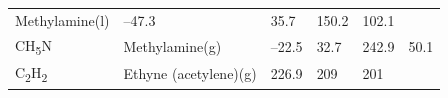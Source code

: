 \documentclass[
  9pt,
]{extbook}
\theoremstyle{definition}
\theoremstyle{definition}
\theoremstyle{definition}
\theoremstyle{remark}
\begin{document}
\begin{longtable}[]{@{}llllll@{}}
\begin{minipage}[t]{0.17\columnwidth}
Methylamine(l)\strut
\end{minipage} & \begin{minipage}[t]{0.15\columnwidth}\raggedright
--47.3\strut
\end{minipage} & \begin{minipage}[t]{0.15\columnwidth}\raggedright
35.7\strut
\end{minipage} & \begin{minipage}[t]{0.14\columnwidth}\raggedright
150.2\strut
\end{minipage} & \begin{minipage}[t]{0.14\columnwidth}\raggedright
102.1\strut
\end{minipage}\tabularnewline
\begin{minipage}[t]{0.07\columnwidth}\raggedright
CH\textsubscript{5}N\strut
\end{minipage} & \begin{minipage}[t]{0.17\columnwidth}\raggedright
Methylamine(g)\strut
\end{minipage} & \begin{minipage}[t]{0.15\columnwidth}\raggedright
--22.5\strut
\end{minipage} & \begin{minipage}[t]{0.15\columnwidth}\raggedright
32.7\strut
\end{minipage} & \begin{minipage}[t]{0.14\columnwidth}\raggedright
242.9\strut
\end{minipage} & \begin{minipage}[t]{0.14\columnwidth}\raggedright
50.1\strut
\end{minipage}\tabularnewline
\begin{minipage}[t]{0.07\columnwidth}\raggedright
C\textsubscript{2}H\textsubscript{2}\strut
\end{minipage} & \begin{minipage}[t]{0.17\columnwidth}\raggedright
Ethyne (acetylene)(g)\strut
\end{minipage} & \begin{minipage}[t]{0.15\columnwidth}\raggedright
226.9\strut
\end{minipage} & \begin{minipage}[t]{0.15\columnwidth}\raggedright
209\strut
\end{minipage} & \begin{minipage}[t]{0.14\columnwidth}\raggedright
201\strut
\end{minipage} & \begin{minipage}[t]{0.14\columnwidth}\raggedright

\end{minipage}
\end{longtable}
\end{document}
